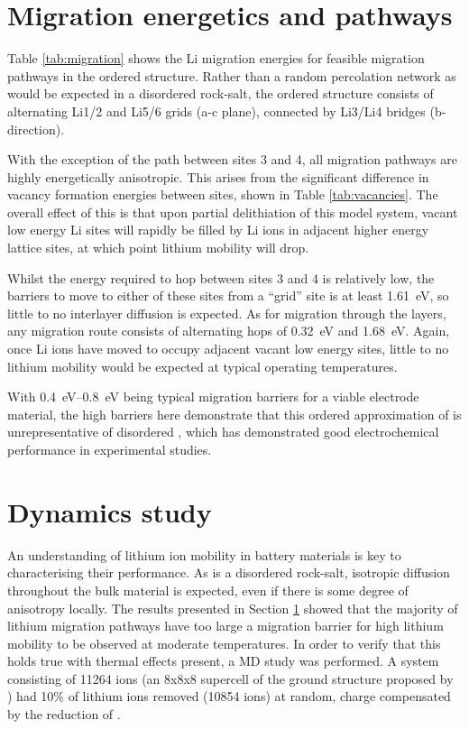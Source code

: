 \section{Migration energetics and pathways}
\label{sec:migration}
Table \ref{tab:migration} shows the Li migration energies for feasible migration pathways in the ordered  structure.
Rather than a random percolation network as would be expected in a disordered rock-salt, the ordered structure consists of alternating Li1/2 and Li5/6 grids (a-c plane), connected by Li3/Li4 bridges (b-direction). 


With the exception of the path between sites 3 and 4, all migration pathways are highly energetically anisotropic.
This arises from the significant difference in vacancy formation energies between sites, shown in Table \ref{tab:vacancies}.
The overall effect of this is that upon partial delithiation of this model system, vacant low energy Li sites will rapidly be filled by Li ions in adjacent higher energy lattice sites, at which point lithium mobility will drop.

Whilst the energy required to hop between sites 3 and 4 is relatively low, the barriers to move to either of these sites from a ``grid'' site is at least \SI{1.61}{\electronvolt}, so little to no interlayer diffusion is expected.
As for migration through the layers, any migration route consists of alternating hops of \SI{0.32}{\electronvolt} and \SI{1.68}{\electronvolt}.
Again, once Li ions have moved to occupy adjacent vacant low energy sites, little to no lithium mobility would be expected at typical operating temperatures.

With \SIrange{0.4}{0.8}{\electronvolt} being typical migration barriers for a viable electrode material, the high barriers here demonstrate that this ordered approximation of  is unrepresentative of disordered , which has demonstrated good electrochemical performance in experimental studies.\cite{Freire2016}


\section{Dynamics study}
An understanding of lithium ion mobility in battery materials is key to characterising their performance.
As  is a disordered rock-salt, isotropic diffusion throughout the bulk material is expected, even if there is some degree of anisotropy locally.
The results presented in Section \ref{sec:migration} showed that the majority of lithium migration pathways have too large a migration barrier for high lithium mobility to be observed at moderate temperatures.
In order to verify that this holds true with thermal effects present, a MD study was performed.
A system consisting of 11264 ions (an 8x8x8 supercell of the ground structure proposed by \citet{Diaz-Lopez2017}) had 10\% of lithium ions removed (10854 ions) at random, charge compensated by the reduction of .

